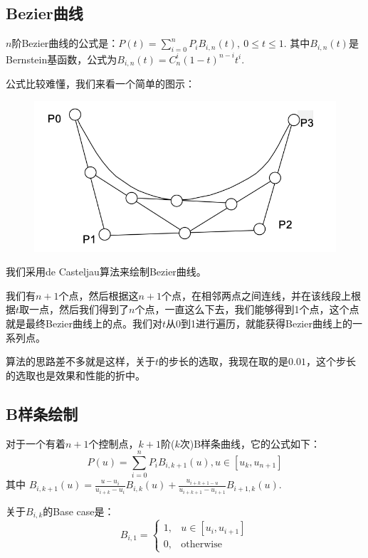 \documentclass[a4paper,UTF8]{article}
\theoremstyle{definition}
\begin{document}
\subsection{Bezier曲线}

$n$阶Bezier曲线的公式是：$P(t) = \sum\limits_{i=0}^{n} P_i B_{i,n}(t), \ 0 \le t \le 1$. 其中$B_{i,n}(t)$是Bernstein基函数，公式为$B_{i,n}(t) = C_n^i (1-t)^{n-i} t^i$.

公式比较难懂，我们来看一个简单的图示：

\begin{figure}[H]
    \centering
    \includegraphics[scale=0.3]{Bezier.png}
\end{figure}

我们采用de Casteljau算法\cite{wiki:De_Casteljau's_algorithm}来绘制Bezier曲线。

我们有$n+1$个点，然后根据这$n+1$个点，在相邻两点之间连线，并在该线段上根据$t$取一点，然后我们得到了$n$个点，一直这么下去，我们能够得到1个点，这个点就是最终Bezier曲线上的点。我们对$t$从0到1进行遍历，就能获得Bezier曲线上的一系列点。

算法的思路差不多就是这样，关于$t$的步长的选取，我现在取的是$0.01$，这个步长的选取也是效果和性能的折中。


\subsection{B样条绘制}
 对于一个有着$n+1$个控制点，$k+1$阶($k$次)B样条曲线，它的公式如下：
    \begin{equation*}
        P(u) = \sum\limits_{i=0}^{n} P_i B_{i, k+1}(u), u \in [u_k, u_{n+1}] 
    \end{equation*}
其中 $B_{i, k+1} (u) = \frac{u - u_i}{u_{i+k} - u_i} B_{i,k}(u) + \frac{u_{i+k+1 - u}}{u_{i+k+1} - u_{i+1}} B_{i+1, k} (u)$. 

关于$B_{i,k}$的Base case是：
    \begin{equation*}
        B_{i, 1} = \begin{cases}
            1, & u \in [u_i, u_{i+1}] \\
            0, & \text{otherwise}
        \end{cases}
    \end{equation*}
\end{document}
